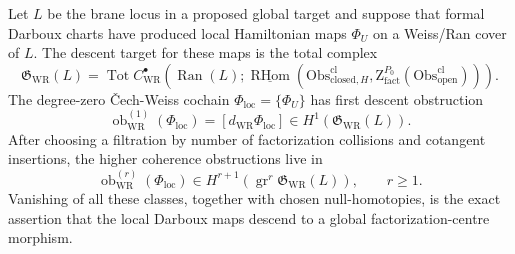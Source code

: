 \begin{defn}\label{defn:global-hamiltonian-descent-complex}
  Let \(L\) be the brane locus in a proposed global target and suppose
  that formal Darboux charts have produced local Hamiltonian maps
  \(\Phi_U\) on a Weiss/Ran cover of \(L\).  The descent target for these
  maps is the total complex
  \[
  \mathfrak G_{\mathrm{WR}}(L)=
  \operatorname{Tot} C^\bullet_{\mathrm{WR}}\!\left(
    \operatorname{Ran}(L);
    \underline{\operatorname{RHom}}\left(
      \mathrm{Obs}^{\mathrm{cl}}_{\mathrm{closed},H},
      \mathrm Z^{P_0}_{\mathrm{fact}}
        (\mathrm{Obs}^{\mathrm{cl}}_{\mathrm{open}})
    \right)\right).
  \]
  The degree-zero \v{C}ech-Weiss cochain \(\Phi_{\mathrm{loc}}=\{\Phi_U\}\)
  has first descent obstruction
  \[
    \operatorname{ob}^{(1)}_{\mathrm{WR}}(\Phi_{\mathrm{loc}})
      =[d_{\mathrm{WR}}\Phi_{\mathrm{loc}}]
      \in H^1(\mathfrak G_{\mathrm{WR}}(L)).
  \]
  After choosing a filtration by number of factorization collisions and
  cotangent insertions, the higher coherence obstructions live in
  \[
    \operatorname{ob}^{(r)}_{\mathrm{WR}}(\Phi_{\mathrm{loc}})
      \in
      H^{r+1}\!\left(
        \operatorname{gr}^r\mathfrak G_{\mathrm{WR}}(L)
      \right),
      \qquad r\ge 1.
  \]
  Vanishing of all these classes, together with chosen null-homotopies, is
  the exact assertion that the local Darboux maps descend to a global
  factorization-centre morphism.
\end{defn}

